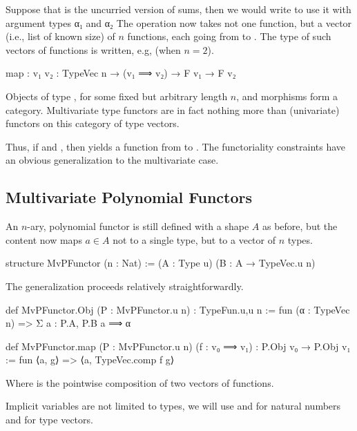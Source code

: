 Suppose that  is the uncurried version of sums, then we would write  to use it with argument types α₁ and α₂ The  operation now takes not one function, but a vector (i.e., list of known size) of $n$ functions, each going from  to . The type of such vectors of functions is written, e.g,  (when $n=2$).

\begin{leancode}
    map : {v₁ v₂ : TypeVec n} → (v₁ ⟹ v₂) → F v₁ → F v₂
\end{leancode}
\begin{remark}
    Objects of type , for some fixed but arbitrary length $n$, and morphisms  form a category. 
    Multivariate type functors are in fact nothing more than (univariate) functors on this category of type vectors.
\end{remark}

Thus, if  and , then  yields a function from  to .
The functoriality constraints have an obvious generalization to the multivariate case.

\subsection*{Multivariate Polynomial Functors}
An $n$-ary, polynomial functor is still defined with a shape $A$ as before, but the content now maps $a ∈ A$ not to a single type, but to a vector of $n$ types.

\begin{leancode}
    structure MvPFunctor (n : Nat) := (A : Type u) (B : A → TypeVec.{u} n)
\end{leancode}

The generalization proceeds relatively straightforwardly.
\begin{leancode}
    def MvPFunctor.Obj (P : MvPFunctor.{u} n) : TypeFun.{u,u} n
        := fun (α : TypeVec n) => Σ a : P.A, P.B a ⟹ α

    def MvPFunctor.map  (P : MvPFunctor.{u} n) 
                        (f : v₀ ⟹ v₁) 
                            : P.Obj v₀ → P.Obj v₁ 
        := fun ⟨a, g⟩ => ⟨a, TypeVec.comp f g⟩
\end{leancode}

Where  is the pointwise composition of two vectors of functions.

\begin{remark}
    Implicit variables are not limited to types, we will use  and  for natural numbers and  for type vectors.
\end{remark}

